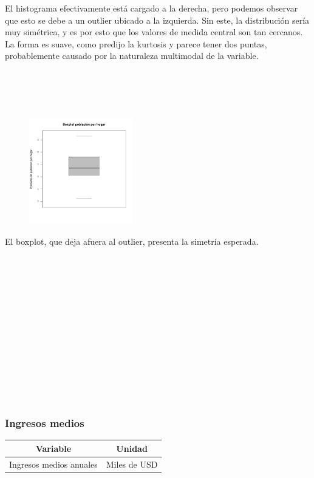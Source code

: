 \documentclass[11pt]{article}
\begin{document}
El histograma efectivamente está cargado a la derecha, pero podemos observar que esto se debe a un outlier ubicado a la izquierda. Sin este, la distribución sería muy simétrica, y es por esto que los valores de medida central son tan cercanos. La forma es suave, como predijo la kurtosis y parece tener dos puntas, probablemente causado por la naturaleza multimodal de la variable.
\\
\\
\\
\\
\\
\begin{figure}
    \centering
    \includegraphics[width = 0.4\textwidth]{boxph}
\end{figure}

El boxplot, que deja afuera al outlier, presenta la simetría esperada.
\\
\\
\\
\\
\\
\\
\\
\\
\\
\\
\\
\\
\\
\\
\subsubsection{Ingresos medios}

\begin{center}
\begin{tabular}{|c|c|}
    \hline
    Variable & Unidad  \\ \hline
    Ingresos medios anuales & Miles de USD \\
    \hline
\end{tabular}
\end{center}
\\
\\
\end{document}
